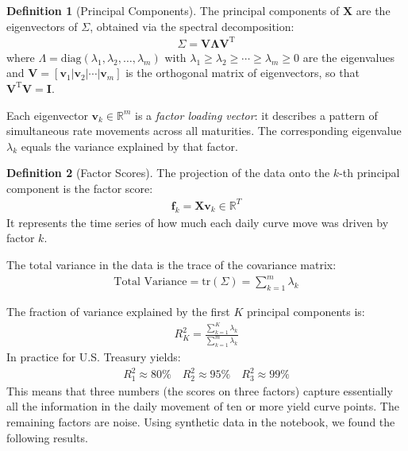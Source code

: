 \documentclass{article}
\theoremstyle{definition}  %
\newtheorem{definition}{Definition}[section]
\theoremstyle{plain}  %
\numberwithin{definition}{section}
\numberwithin{proposition}{section}
\numberwithin{theorem}{section}
\numberwithin{equation}{section}
\begin{document}
\begin{definition}[Principal Components]
    The principal components of $\mathbf{X}$ are the eigenvectors of $\Sigma$, obtained via the spectral decomposition:
    \begin{align*}
        \Sigma = \mathbf{V} \mathbf{\Lambda} \mathbf{V}^{\mathrm{T}}
    \end{align*}
    where $\Lambda = \text{diag}(\lambda_{1}, \lambda_{2}, \dots, \lambda_{m})$ with $\lambda_{1} \geq \lambda_{2} \geq \cdots \geq \lambda_{m} \geq 0$ are the eigenvalues and $\mathbf{V} = [\mathbf{v}_{1} | \mathbf{v}_{2} | \cdots | \mathbf{v}_{m}]$ is the orthogonal matrix of eigenvectors, so that $\mathbf{V}^{\mathrm{T}} \mathbf{V} = \mathbf{I}$.
\end{definition}

Each eigenvector $\mathbf{v}_{k} \in \mathbb{R}^{m}$ is a \textit{factor loading vector}: it describes a pattern of simultaneous rate movements across all maturities. The corresponding eigenvalue $\lambda_{k}$ equals the variance explained by that factor.

\begin{definition}[Factor Scores]
    The projection of the data onto the $k$-th principal component is the factor score:
    \begin{align*}
        \mathbf{f}_{k} = \mathbf{X} \mathbf{v}_{k} \in \mathbb{R}^{T}
    \end{align*}
    It represents the time series of how much each daily curve move was driven by factor $k$.
\end{definition}

The total variance in the data is the trace of the covariance matrix:
\begin{align*}
    \text{Total Variance} = \text{tr}(\Sigma) = \sum_{k = 1}^{m} \lambda_{k}
\end{align*}

The fraction of variance explained by the first $K$ principal components is:
\begin{align*}
    R^{2}_{K} = \frac{\sum_{k = 1}^{K} \lambda_{k}}{\sum_{k = 1}^{m} \lambda_{k}}
\end{align*}
In practice for U.S. Treasury yields:
\begin{align*}
    R^{2}_{1} \approx 80 \% \quad R^{2}_{2} \approx 95 \% \quad R^{2}_{3} \approx 99 \%
\end{align*}
This means that three numbers (the scores on three factors) capture essentially all the information in the daily movement of ten or more yield curve points. The remaining factors are noise. Using synthetic data in the notebook, we found the following results.
\end{document}
